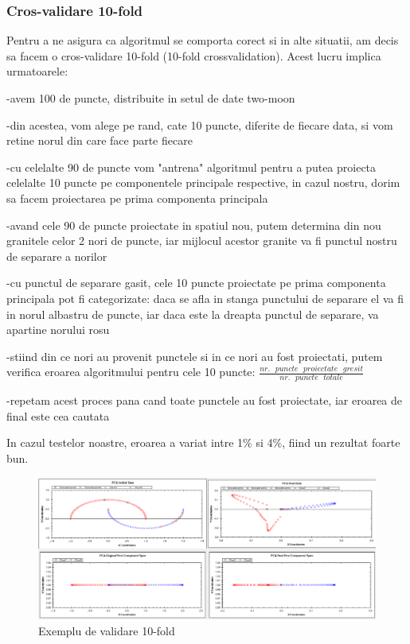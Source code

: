 \documentclass[12pt]{article}
\begin{document}
\subsubsection{Cros-validare 10-fold}
Pentru a ne asigura ca algoritmul se comporta corect si in alte situatii, am decis sa facem o cros-validare 10-fold (10-fold crossvalidation). Acest lucru implica urmatoarele: 

-avem 100 de puncte, distribuite in setul de date two-moon

-din acestea, vom alege pe rand, cate 10 puncte, diferite de fiecare data, si vom retine norul din care face parte fiecare

-cu celelalte 90 de puncte vom "antrena" algoritmul pentru a putea proiecta celelalte 10 puncte pe componentele principale respective, in cazul nostru, dorim sa facem proiectarea pe prima componenta principala

-avand cele 90 de puncte proiectate in spatiul nou, putem determina din nou granitele celor 2 nori de puncte, iar mijlocul acestor granite va fi punctul nostru de separare a norilor

-cu punctul de separare gasit, cele 10 puncte proiectate pe prima componenta principala pot fi categorizate: daca se afla in stanga punctului de separare el va fi in norul albastru de puncte, iar daca este la dreapta punctul de separare, va apartine norului rosu

-stiind din ce nori au provenit punctele si in ce nori au fost proiectati, putem verifica eroarea algoritmului pentru cele 10 puncte: $\frac{nr. \text { } puncte \text { } proiectate \text { } gresit}{nr. \text { } puncte \text { } totale}$

-repetam acest proces pana cand toate punctele au fost proiectate, iar eroarea de final este cea cautata

In cazul testelor noastre, eroarea a variat intre 1\% si 4\%, fiind un rezultat foarte bun.

\begin{figure}[H]
\centering
\caption{Exemplu de validare 10-fold}
\includegraphics[width=\linewidth]{tenfold1}
\end{figure}
\end{document}
